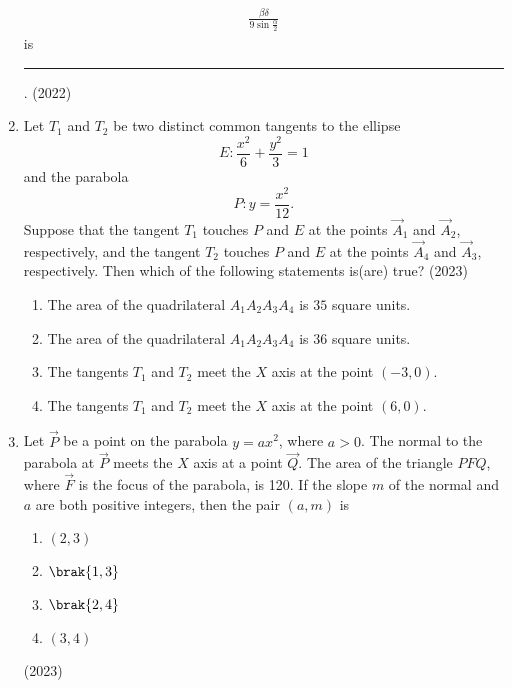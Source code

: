 \begin{enumerate}[label=\thesubsection.\arabic*.,ref=\thesubsection.\theenumi]
\begin{align*}
\frac{\beta \delta}{9 \sin \frac{\alpha}{2}}
		\end{align*}
is \rule{1cm}{0.1pt}.
\hfill (2022)     
 \item Let $T_1$ and $T_2$ be two distinct common tangents to the ellipse $$E: \frac{x^2}{6} + \frac{y^2}{3} = 1 $$ and the parabola $$P: y = \frac{x^2}{12}.$$ Suppose that the tangent $T_1$ touches $P$ and $E$ at the points $\vec{A}_1$ and $\vec{A}_2$, respectively, and the tangent $T_2$ touches $P$ and $E$ at the points $\vec{A}_4$ and $\vec{A}_3$, respectively. Then which of the following statements is(are) true?
\hfill (2023)
\begin{enumerate}
 \item The area of the quadrilateral ${A}_1{A}_2{A}_3{A}_4$ is $35$ square units.  
 \item The area of the quadrilateral ${A}_1{A}_2{A}_3{A}_4$ is $36$ square units.  
 \item The tangents $T_1$ and $T_2$ meet the $X$ axis at the point $(-3,0)$.  
 \item The tangents $T_1$ and $T_2$ meet the $X$ axis at the point $(6,0)$.  
\end{enumerate}
\item Let $\vec{P}$ be a point on the parabola $ y = ax^2$, where $a > 0$. The normal to the parabola at $\vec{P}$ meets the $X$ axis at a point $\vec{Q}$. The area of the triangle $PFQ$, where $\vec{F}$ is the focus of the parabola, is 120. If the slope $m$ of the normal and $a$ are both positive integers, then the pair $(a, m)$ is 
\begin{multicols}{4}
\begin{enumerate}
 \item $(2, 3)$
 \item $\brak{1, 3}$
 \item $\brak{2, 4}$
 \item $(3, 4)$
\end{enumerate}
\end{multicols}
\hfill (2023) 
\end{enumerate}
